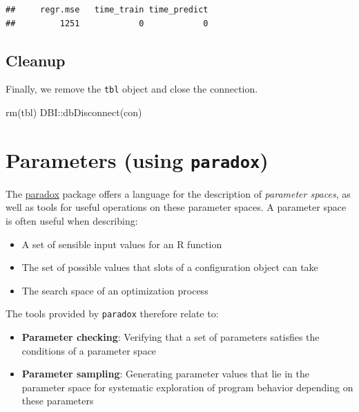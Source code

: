 \documentclass[
]{scrbook}
\newenvironment{Shaded}{\begin{snugshade}}{\end{snugshade}}
\newcommand{\FunctionTok}[1]{\textcolor[rgb]{0.00,0.00,0.00}{#1}}
\newcommand{\NormalTok}[1]{#1}
\newcommand{\SpecialCharTok}[1]{\textcolor[rgb]{0.00,0.00,0.00}{#1}}
\providecommand{\tightlist}{%
  \setlength{\itemsep}{0pt}\setlength{\parskip}{0pt}}
\renewenvironment{Shaded} {\begin{snugshade}\small} {\end{snugshade}}
\begin{document}
\begin{verbatim}
##     regr.mse   time_train time_predict 
##         1251            0            0
\end{verbatim}

\hypertarget{cleanup}{%
\subsection{Cleanup}\label{cleanup}}

Finally, we remove the \texttt{tbl} object and close the connection.

\begin{Shaded}
\begin{Highlighting}[]
\FunctionTok{rm}\NormalTok{(tbl)}
\NormalTok{DBI}\SpecialCharTok{::}\FunctionTok{dbDisconnect}\NormalTok{(con)}
\end{Highlighting}
\end{Shaded}

\hypertarget{paradox}{%
\section{\texorpdfstring{Parameters (using \texttt{paradox})}{Parameters (using paradox)}}\label{paradox}}

The \href{https://paradox.mlr-org.com}{paradox} package offers a language for the description of \emph{parameter spaces}, as well as tools for useful operations on these parameter spaces.
A parameter space is often useful when describing:

\begin{itemize}
\tightlist
\item
  A set of sensible input values for an R function
\item
  The set of possible values that slots of a configuration object can take
\item
  The search space of an optimization process
\end{itemize}

The tools provided by \texttt{paradox} therefore relate to:

\begin{itemize}
\tightlist
\item
  \textbf{Parameter checking}: Verifying that a set of parameters satisfies the conditions of a parameter space
\item
  \textbf{Parameter sampling}: Generating parameter values that lie in the parameter space for systematic exploration of program behavior depending on these parameters
\end{itemize}
\end{document}
